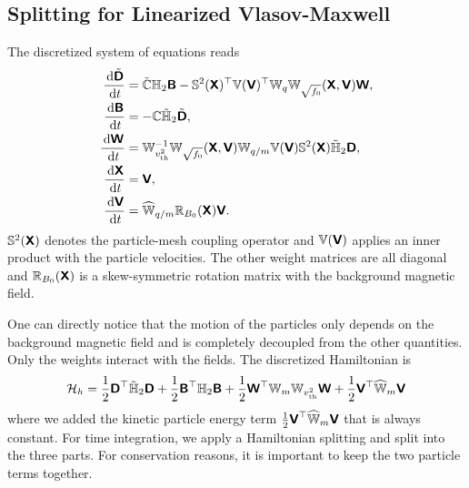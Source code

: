 \documentclass[11pt]{article}
\begin{document}
\subsection{Splitting for Linearized Vlasov-Maxwell}
\label{sec:splitting_linvlasovmaxwell}

\newcommand{\Smat}{\mathbb{S}^2(\arrX)}
\newcommand{\Vmat}{\mathbb{V}(\arrV)}
\newcommand{\Wvth}{\mathbb{W}_{v^2_\textup{th}}}
\newcommand{\Wfz}{\mathbb{W}_{\sqrt{f_0}}(\arrX,\arrV)}
\newcommand{\Wq}{\mathbb{W}_q}
\newcommand{\Wm}{\mathbb{W}_m}
\def\Wmh{\widehat{\mathbb{W}}_m}
\newcommand{\Wqm}{\mathbb{W}_{q/m}}
\newcommand{\Wqmh}{\widehat{\mathbb{W}}_{q/m}}
\def\Rmat{\mathbb{R}_{B_0}(\arrX)}

The discretized system of equations reads
\begin{align}
    \fract{\tilde{\arrD}}{t} & = \tilde{\mat{C}} \hodgeTwo \arrB - \Smat^\top \Vmat^\top \Wq \Wfz \arrW, \\
    \fract{\arrB}{t}         & = - \mat{C} \hodgeDualTwo \tilde{\arrD},                                  \\
    \fract{\arrW}{t}         & = \Wvth^{-1} \Wfz \Wqm \Vmat \Smat \hodgeDualTwo \arrD,                   \\
    \fract{\arrX}{t}         & = \arrV,                                                                  \\
    \fract{\arrV}{t}         & = \Wqmh \Rmat \arrV.
\end{align}
$\Smat$ denotes the particle-mesh coupling operator and $\Vmat$ applies an inner product with the particle velocities. The other weight matrices are all diagonal and $\Rmat$ is a skew-symmetric rotation matrix with the background magnetic field.

One can directly notice that the motion of the particles only depends on the background magnetic field and is completely decoupled from the other quantities. Only the weights interact with the fields. The discretized Hamiltonian is
\begin{equation}
    \cH_h = \frac{1}{2} \arrD^\top \hodgeDualTwo \arrD + \frac{1}{2} \arrB^\top \hodgeTwo \arrB + \frac{1}{2} \arrW^\top \Wm \Wvth \arrW + \frac{1}{2} \arrV^\top \Wmh \arrV
\end{equation}
where we added the kinetic particle energy term $\frac{1}{2} \arrV^\top \Wmh \arrV$ that is always constant. For time integration, we apply a Hamiltonian splitting and split into the three parts. For conservation reasons, it is important to keep the two particle terms together.
\end{document}
